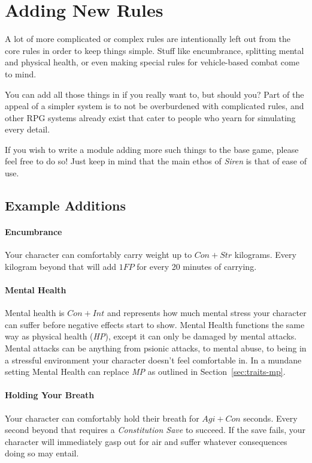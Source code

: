 \section{Adding New Rules}\label{sec:hacking-rules}
A lot of more complicated or complex rules are intentionally left out from the core rules in order to keep things simple.
Stuff like encumbrance, splitting mental and physical health, or even making special rules for vehicle-based combat come to mind.

You can add all those things in if you really want to, but should you?
Part of the appeal of a simpler system is to not be overburdened with complicated rules, and other RPG systems already exist that cater to people who yearn for simulating every detail.

If you wish to write a module adding more such things to the base game, please feel free to do so! Just keep in mind that the main ethos of \textit{Siren} is that of ease of use.

\subsection{Example Additions}

\paragraph{Encumbrance} Your character can comfortably carry weight up to $Con + Str$ kilograms. 
Every kilogram beyond that will add $1\mathit{FP}$ for every 20 minutes of carrying.

\paragraph{Mental Health} Mental health is $Con + Int$ and represents how much mental stress your character can suffer before negative effects start to show.
Mental Health functions the same way as physical health (\textit{HP}), except it can only be damaged by mental attacks.
Mental attacks can be anything from psionic attacks, to mental abuse, to being in a stressful environment your character doesn't feel comfortable in.
In a mundane setting Mental Health can replace \textit{MP} as outlined in Section~\ref{sec:traits-mp}.

\paragraph{Holding Your Breath} Your character can comfortably hold their breath for $Agi + Con$ seconds.
Every second beyond that requires a \textit{Constitution Save} to succeed.
If the save fails, your character will immediately gasp out for air and suffer whatever consequences doing so may entail.